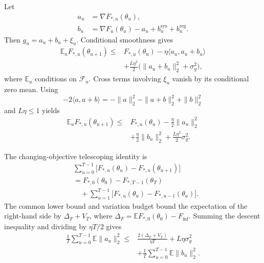 Let
\begin{equation*}
\begin{split}
 a_u&=\nabla F_{*,u}(\theta_u),\\
 b_u&=\nabla F_u(\theta_u)-a_u
      +b_u^{\mathrm{sys}}+b_u^{\mathrm{reg}}.
\end{split}
\end{equation*}
Then $g_u=a_u+b_u+\xi_u$. Conditional smoothness gives
\begin{equation}
\begin{split}
 \mathbb E_uF_{*,u}(\theta_{u+1})
 \le{}&F_{*,u}(\theta_u)-\eta\langle a_u,a_u+b_u\rangle\\
 &+\frac{L\eta^2}{2}
       \bigl(\|a_u+b_u\|_2^2+\sigma_g^2\bigr),
\end{split}
\label{eq:supp_smooth_descent}
\end{equation}
where $\mathbb E_u$ conditions on $\mathcal F_u$. Cross terms involving $\xi_u$ vanish by its conditional zero mean. Using
\begin{equation*}
 -2\langle a,a+b\rangle
 =-\|a\|_2^2-\|a+b\|_2^2+\|b\|_2^2
\end{equation*}
and $L\eta\le1$ yields
\begin{equation}
\begin{split}
 \mathbb E_uF_{*,u}(\theta_{u+1})
 \le{}&F_{*,u}(\theta_u)-\frac{\eta}{2}\|a_u\|_2^2\\
 &+\frac{\eta}{2}\|b_u\|_2^2
 +\frac{L\eta^2}{2}\sigma_g^2.
\end{split}
\label{eq:supp_biased_descent}
\end{equation}

The changing-objective telescoping identity is
\begin{equation}
\begin{split}
 &\sum_{u=0}^{T-1}
   \bigl[F_{*,u}(\theta_u)-F_{*,u}(\theta_{u+1})\bigr]\\
 &=F_{*,0}(\theta_0)-F_{*,T-1}(\theta_T)\\
 &\quad+\sum_{u=1}^{T-1}
   \bigl[F_{*,u}(\theta_u)-F_{*,u-1}(\theta_u)\bigr].
\end{split}
\label{eq:supp_telescoping}
\end{equation}
The common lower bound and variation budget bound the expectation of the right-hand side by $\Delta_F+V_T$, where
$\Delta_F=\mathbb E F_{*,0}(\theta_0)-F_{\inf}$.
Summing the descent inequality and dividing by $\eta T/2$ gives
\begin{equation}
\begin{split}
 \frac1T\sum_{u=0}^{T-1}\mathbb E\|a_u\|_2^2
 \le{}&\frac{2(\Delta_F+V_T)}{\eta T}
       +L\eta\sigma_g^2\\
 &+\frac1T\sum_{u=0}^{T-1}\mathbb E\|b_u\|_2^2.
\end{split}
\label{eq:supp_average_descent}
\end{equation}

